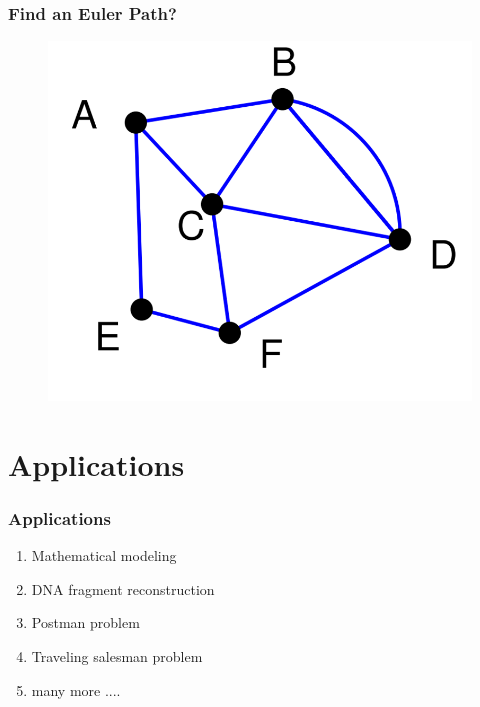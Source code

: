 \documentclass{beamer}
\begin{document}
\begin{frame}
\frametitle{Find an Euler Path?}
\begin{figure}[h]
\includegraphics[scale = 0.4]{path2.png}
\end{figure}
\end{frame}




\section{Applications}


\begin{frame}
\frametitle{Applications}
\begin{enumerate}
\item Mathematical modeling
\item DNA fragment reconstruction
\item Postman problem
\item Traveling salesman problem

\item many more ....
\end{enumerate}
\end{frame}
\end{document}
